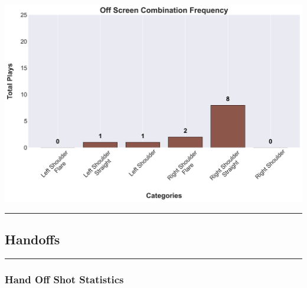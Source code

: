 \documentclass[a4paper,12pt]{article}
\begin{document}
\begin{table}[H]
{\begin{minipage}[t]{0.6\textwidth}
{\begin{tabular}
            \bottomrule
        \end{tabular}
        } %
    \end{minipage}
    } %
    \hfill %
    \begin{minipage}[c]{0.35\textwidth} %
        \flushright
        \includegraphics[width=\textwidth, height=.14\textheight]{images/OffScreen_Combination_Freq.png} %
    \end{minipage}
\end{table}

\vspace{-1em} %
\hrule height 1pt width 1\textwidth %
\vspace{1em} %

\subsection{Handoffs}

\vspace{1em} %
\hrule height 1pt width 1\textwidth %
\vspace{1em} %

\subsubsection{Hand Off Shot Statistics}
\end{document}
